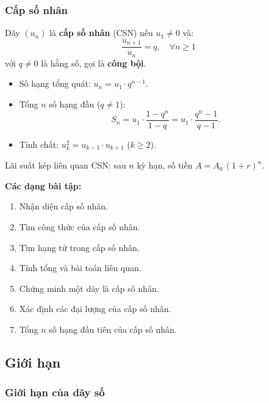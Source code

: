 \documentclass[12pt,a4paper]{article}
\begin{document}
\subsubsection{Cấp số nhân}

\begin{dinhnghia}
  Dãy $(u_n)$ là \textbf{cấp số nhân} (CSN) nếu $u_1 \ne 0$ và:
  \[
    \dfrac{u_{n+1}}{u_n} = q,\quad \forall n \ge 1
  \]
  với $q \ne 0$ là hằng số, gọi là \textbf{công bội}.
\end{dinhnghia}

\begin{congthuc}
  \begin{itemize}
    \item Số hạng tổng quát: $u_n = u_1 \cdot q^{n-1}$.
    \item Tổng $n$ số hạng đầu ($q \ne 1$):
      \[
        S_n = u_1 \cdot \dfrac{1 - q^n}{1 - q} = u_1 \cdot \dfrac{q^n - 1}{q - 1}.
      \]
    \item Tính chất: $u_k^2 = u_{k-1} \cdot u_{k+1}$ \;($k \ge 2$).
  \end{itemize}
\end{congthuc}

\begin{luuy}
  Lãi suất kép liên quan CSN: sau $n$ kỳ hạn, số tiền $A = A_0\,(1 + r)^n$.
\end{luuy}

\medskip\noindent\textbf{Các dạng bài tập:}
\begin{enumerate}[label=\textbf{Dạng \arabic*:}, leftmargin=*, align=left]
  \item Nhận diện cấp số nhân.
  \item Tìm công thức của cấp số nhân.
  \item Tìm hạng tử trong cấp số nhân.
  \item Tính tổng và bài toán liên quan.
  \item Chứng minh một dãy là cấp số nhân.
  \item Xác định các đại lượng của cấp số nhân.
  \item Tổng $n$ số hạng đầu tiên của cấp số nhân.
\end{enumerate}

\subsection{Giới hạn}

\subsubsection{Giới hạn của dãy số}
\end{document}
